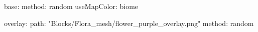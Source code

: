 base:
  method: random
  useMapColor: biome
  
overlay:
  path: "Blocks/Flora_mesh/flower_purple_overlay.png"
  method: random